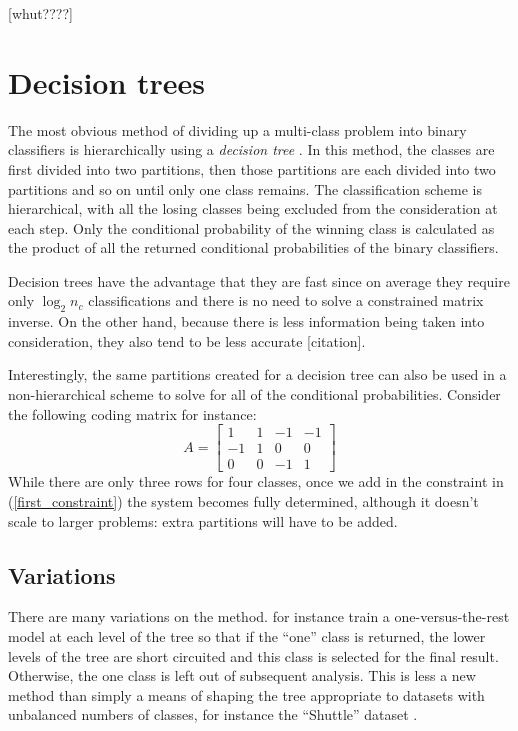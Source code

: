 \documentclass{article}
\begin{document}
[whut????]


\section{Decision trees}

The most obvious method of dividing up a multi-class problem into binary
classifiers is hierarchically using a {\it decision tree} 
\citep{Cheong_etal2004, Lee_Oh2003}.
In this method, the classes are first divided into two partitions, then
those partitions are each divided into two partitions and so on until only
one class remains. The classification scheme is hierarchical, with all the
losing classes being excluded from the consideration at each step.
Only the conditional probability of the winning class is calculated as the
product of all the returned conditional probabilities of the binary
classifiers.

Decision trees have the advantage that they are fast since on average they
require only $\log_2 n_c$ classifications and there is no need to solve a 
constrained matrix inverse. On the other hand, because there is less
information being taken into consideration, they also tend to be less
accurate [citation].

Interestingly, the same partitions created for a decision tree can also
be used in a non-hierarchical scheme
to solve for all of the conditional probabilities. Consider the following
coding matrix for instance:
\begin{equation}
A = 
\begin{bmatrix}
1 & 1 & -1 & -1 \\
-1 & 1 & 0 & 0 \\
0 & 0 & -1 & 1
\end{bmatrix}
\end{equation}
While there are only three rows for four classes, 
once we add in the constraint in (\ref{first_constraint}) the system becomes 
fully determined, although it doesn't scale to larger problems:
extra partitions will have to be added.

\subsection{Variations}

There are many variations on the method. \citet{Ramanan_etal2007} for instance train a 
one-versus-the-rest model at each level of the tree so that if the ``one''
class is returned, the lower levels of the tree are short circuited
and this class is selected for the final result. Otherwise, the one class
is left out of subsequent analysis. This is less a new method than simply
a means of shaping the tree appropriate to datasets with unbalanced
numbers of classes, for instance the ``Shuttle'' dataset \citep{King_etal1995}.
\end{document}
